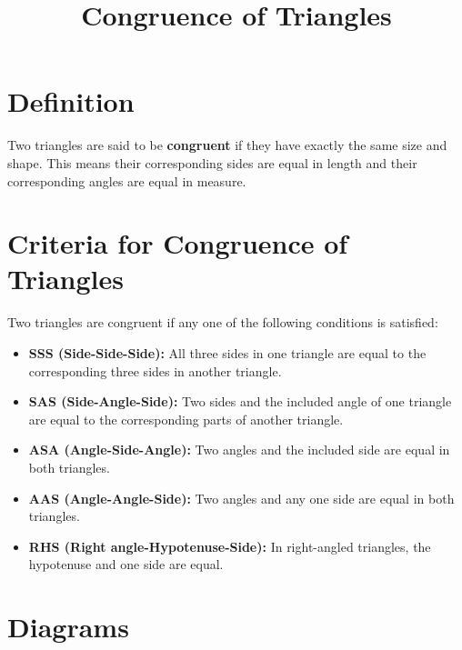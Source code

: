 \documentclass[12pt]{article}
\title{Congruence of Triangles}
\author{}
\date{}
\begin{document}
\maketitle

\section{Definition}

Two triangles are said to be \textbf{congruent} if they have exactly the same size and shape. This means their corresponding sides are equal in length and their corresponding angles are equal in measure.

\section{Criteria for Congruence of Triangles}

Two triangles are congruent if any one of the following conditions is satisfied:

\begin{itemize}
  \item \textbf{SSS (Side-Side-Side):} All three sides in one triangle are equal to the corresponding three sides in another triangle.
  \item \textbf{SAS (Side-Angle-Side):} Two sides and the included angle of one triangle are equal to the corresponding parts of another triangle.
  \item \textbf{ASA (Angle-Side-Angle):} Two angles and the included side are equal in both triangles.
  \item \textbf{AAS (Angle-Angle-Side):} Two angles and any one side are equal in both triangles.
  \item \textbf{RHS (Right angle-Hypotenuse-Side):} In right-angled triangles, the hypotenuse and one side are equal.
\end{itemize}

\section{Diagrams}

\begin{figure}[H]
\centering
{}
\end{figure}
\end{document}
